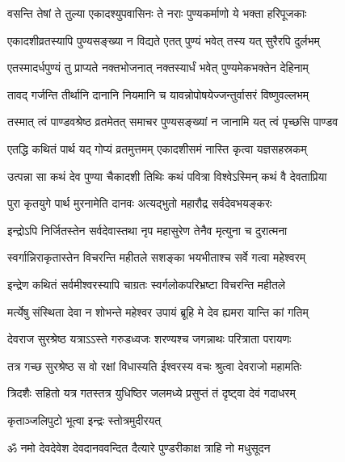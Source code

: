 \twolineshloka
{वसन्ति तेषां ते तुल्या एकादश्युपवासिनः}
{ते नराः पुण्यकर्माणो ये भक्ता हरिपूजकाः}%

\twolineshloka
{एकादशीव्रतस्यापि पुण्यसङ्ख्या न विद्यते}
{एतत् पुण्यं भवेत् तस्य यत् सुरैरपि दुर्लभम्}%

\twolineshloka
{एतस्मादर्धपुण्यं तु प्राप्यते नक्तभोजनात्}
{नक्तस्यार्धं भवेत् पुण्यमेकभक्तेन देहिनाम्}%

\twolineshloka
{तावद् गर्जन्ति तीर्थानि दानानि नियमानि च}
{यावन्नोपोषयेज्जन्तुर्वासरं विष्णुवल्लभम्}%

\twolineshloka
{तस्मात् त्वं पाण्डवश्रेष्ठ व्रतमेतत् समाचर}
{पुण्यसङ्ख्यां न जानामि यत् त्वं पृच्छसि पाण्डव}%

\twolineshloka
{एतद्धि कथितं पार्थ यद् गोप्यं व्रतमुत्तमम्}
{एकादशीसमं नास्ति कृत्वा यज्ञसहस्रकम्}%


\twolineshloka
{उत्पन्ना सा कथं देव पुण्या चैकादशी तिथिः}
{कथं पवित्रा विश्वेऽस्मिन् कथं वै देवताप्रिया}%


\twolineshloka
{पुरा कृतयुगे पार्थ मुरनामेति दानवः}
{अत्यद्भुतो महारौद्र सर्वदेवभयङ्करः}%

\twolineshloka
{इन्द्रोऽपि निर्जितस्तेन सर्वदेवास्तथा नृप}
{महासुरेण तेनैव मृत्युना च दुरात्मना}%

\twolineshloka
{स्वर्गान्निराकृतास्तेन विचरन्ति महीतले}
{सशङ्का भयभीताश्च सर्वे गत्वा महेश्वरम्}%

\twolineshloka
{इन्द्रेण कथितं सर्वमीश्वरस्यापि चाग्रतः}
{स्वर्गलोकपरिभ्रष्टा विचरन्ति  महीतले}%

\twolineshloka
{मर्त्येषु संस्थिता देवा न शोभन्ते महेश्वर}
{उपायं ब्रूहि मे देव ह्यमरा यान्ति कां गतिम्}%


\twolineshloka
{देवराज सुरश्रेष्ठ यत्राऽऽस्ते गरुडध्वजः}
{शरण्यश्च जगन्नाथः परित्राता परायणः}%

\twolineshloka
{तत्र गच्छ सुरश्रेष्ठ स वो रक्षां विधास्यति}
{ईश्वरस्य वचः श्रुत्वा देवराजो महामतिः}%

\twolineshloka
{त्रिदशैः सहितो यत्र गतस्तत्र युधिष्ठिर}
{जलमध्ये प्रसुप्तं तं दृष्ट्वा देवं गदाधरम्}%

\onelineshloka
{कृताञ्जलिपुटो भूत्वा इन्द्रः स्तोत्रमुदीरयत्}%


\twolineshloka
{ॐ नमो देवदेवेश देवदानववन्दित}
{दैत्यारे पुण्डरीकाक्ष त्राहि नो मधुसूदन}%

